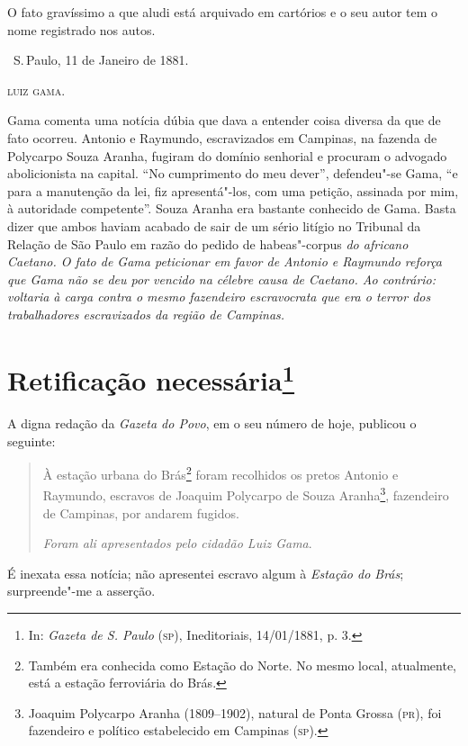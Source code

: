O fato gravíssimo a que aludi está arquivado em cartórios e o seu autor
tem o nome registrado nos autos.

\bigskip

\hfill\ S.\,Paulo, 11 de Janeiro de 1881.

\hfill\textsc{luiz gama.}

\pagebreak
\mbox{}\vfill
\thispagestyle{empty}

{\small\noindent
Gama comenta uma notícia dúbia que dava a entender coisa diversa
da que de fato ocorreu. Antonio e Raymundo, escravizados em Campinas, na
fazenda de Polycarpo Souza Aranha, fugiram do domínio senhorial e
procuram o advogado abolicionista na capital. ``No cumprimento do meu
dever'', defendeu"-se Gama, ``e para a manutenção da lei, fiz
apresentá"-los, com uma petição, assinada por mim, à autoridade
competente''. Souza Aranha era bastante conhecido de Gama. Basta dizer
que ambos haviam acabado de sair de um sério litígio no Tribunal da
Relação de São Paulo em razão do pedido de} habeas"-corpus \emph{do
africano Caetano. O fato de Gama peticionar em favor de Antonio e
Raymundo reforça que Gama não se deu por vencido na célebre causa de
Caetano. Ao contrário: voltaria à carga contra o mesmo fazendeiro
escravocrata que era o terror dos trabalhadores escravizados da região
de Campinas. }

\chapter{Retificação necessária\footnote[*]{In: \emph{Gazeta de S.
  Paulo} (\textsc{sp}), Ineditoriais, 14/01/1881, p. 3.}}


A digna redação da \emph{Gazeta do Povo}, em o seu número de hoje,
publicou o seguinte:

\begin{quote}
À estação urbana do Brás\footnote{Também era conhecida como Estação
  do Norte. No mesmo local, atualmente, está a estação ferroviária do
  Brás.} foram recolhidos os pretos Antonio e Raymundo, escravos de
Joaquim Polycarpo de Souza Aranha\footnote{Joaquim Polycarpo Aranha
  (1809--1902), natural de Ponta Grossa (\textsc{pr}), foi fazendeiro e político
  estabelecido em Campinas (\textsc{sp}).},
fazendeiro de Campinas, por
andarem fugidos.

\emph{Foram ali apresentados pelo cidadão Luiz Gama}.
\end{quote}

É inexata essa notícia; não apresentei escravo algum à \emph{Estação do
Brás}; surpreende"-me a asserção.

